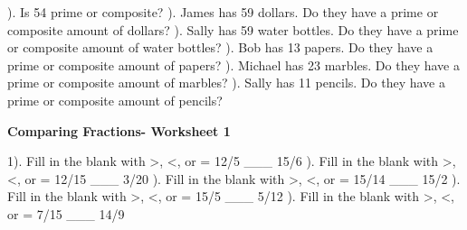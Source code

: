 \documentclass{article}%
\begin{document}
\newline%
\newline%
). Is 54 prime or composite?%
\newline%
\newline%
). James has 59 dollars. Do they have a prime or composite amount of dollars?%
\newline%
\newline%
). Sally has 59 water bottles. Do they have a prime or composite amount of water bottles?%
\newline%
\newline%
). Bob has 13 papers. Do they have a prime or composite amount of papers?%
\newline%
\newline%
). Michael has 23 marbles. Do they have a prime or composite amount of marbles?%
\newline%
\newline%
). Sally has 11 pencils. Do they have a prime or composite amount of pencils?%
\newline%
\newline%
\newline%
\pagebreak%
\large%
\begin{center}%
\textbf{Comparing Fractions- Worksheet 1}%
\newline%
\end{center} \normalsize%
1). Fill in the blank with >, <, or = 12/5 \_\_\_ 15/6%
\newline%
\newline%
). Fill in the blank with >, <, or = 12/15 \_\_\_ 3/20%
\newline%
\newline%
). Fill in the blank with >, <, or = 15/14 \_\_\_ 15/2%
\newline%
\newline%
). Fill in the blank with >, <, or = 15/5 \_\_\_ 5/12%
\newline%
\newline%
). Fill in the blank with >, <, or = 7/15 \_\_\_ 14/9%
\end{document}
